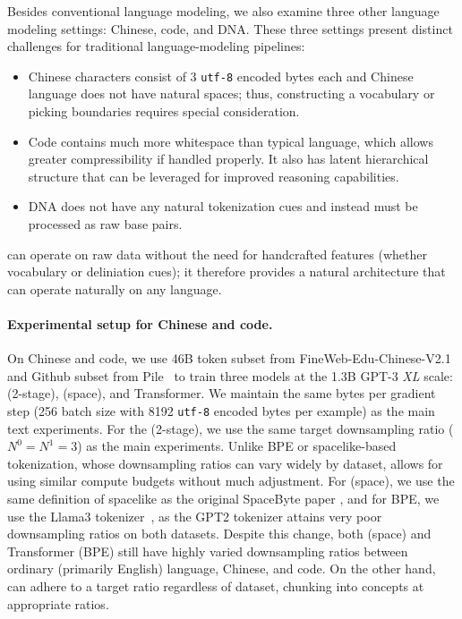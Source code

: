 

Besides conventional language modeling, we also examine three other language modeling settings: Chinese, code, and DNA. These three settings present distinct challenges for traditional language-modeling pipelines:
\begin{itemize}
    \item Chinese characters consist of 3 \texttt{utf-8} encoded bytes each and Chinese language does not have natural spaces; thus, constructing a vocabulary or picking boundaries requires special consideration.
    \item Code contains much more whitespace than typical language, which allows greater compressibility if handled properly. 
        It also has latent hierarchical structure that can be leveraged for improved reasoning capabilities.
    \item DNA does not have any natural tokenization cues and instead must be processed as raw base pairs. 
\end{itemize} 

\model{} can operate on raw data without the need for handcrafted features (whether vocabulary or deliniation cues); it therefore provides a natural architecture that can operate naturally on any language.


\paragraph{Experimental setup for Chinese and code.}
On Chinese and code, we use 46B token subset from FineWeb-Edu-Chinese-V2.1~\citep{OpenCSG} and Github subset from Pile~\citep{pile} to train three models at the 1.3B GPT-3 \textit{XL} scale: \model{} (2-stage), \model{} (space), and Transformer.
We maintain the same bytes per gradient step (256 batch size with 8192 \texttt{utf-8} encoded bytes per example) as the main text experiments. For the \model{} (2-stage), we use the same target downsampling ratio ($N^0=N^1=3$) as the main experiments. Unlike BPE or spacelike-based tokenization, whose downsampling ratios can vary widely by dataset, \model{} allows for using similar compute budgets without much adjustment. For \model{} (space), we use the same definition of spacelike as the original SpaceByte paper \citep{SpaceByte}, and for BPE, we use the Llama3 tokenizer~\citep{Llama3}, as the GPT2 tokenizer attains very poor downsampling ratios on both datasets. Despite this change, both \model{} (space) and Transformer (BPE) still have highly varied downsampling ratios between ordinary (primarily English) language, Chinese, and code. On the other hand, \model{} can adhere to a target ratio regardless of dataset, chunking into concepts at appropriate ratios.


